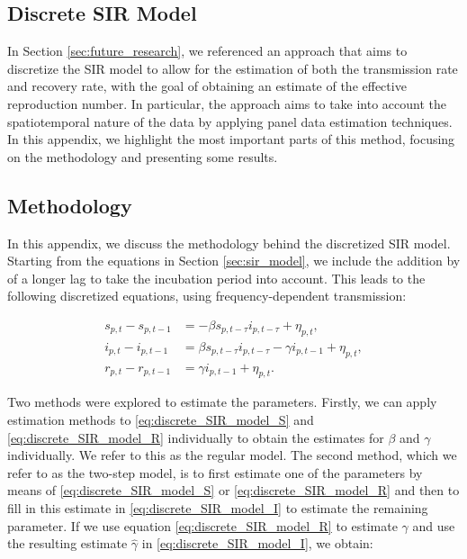\documentclass[12pt]{article}
\begin{document}
\begin{appendices}
		\newpage
		\section{Discrete SIR Model} \label{app:discrete_SIR}
		In Section \ref{sec:future_research}, we referenced an approach that aims to discretize the SIR model to allow for the estimation of both the transmission rate and recovery rate, with the goal of obtaining an estimate of the effective reproduction number. In particular, the approach aims to take into account the spatiotemporal nature of the data by applying panel data estimation techniques. In this appendix, we highlight the most important parts of this method, focusing on the methodology and presenting some results.
		
		\subsection{Methodology} \label{sapp:discrete_SIR_methodology}
		In this appendix, we discuss the methodology behind the discretized SIR model. Starting from the equations in Section \ref{sec:sir_model}, we include the addition by \textcite{adda2016economic} of a longer lag to take the incubation period into account. This leads to the following discretized equations, using frequency-dependent transmission:
		
		\begin{align}
        	s_{p,t} - s_{p,t-1} &= -\beta s_{p,t-\tau}i_{p,t-\tau} + \eta_{p,t}, \label{eq:discrete_SIR_model_S}\\
        	i_{p,t} - i_{p,t-1} &= \beta s_{p,t-\tau}i_{p,t-\tau} - \gamma i_{p,t-1} + \eta_{p,t}, \label{eq:discrete_SIR_model_I}\\
        	r_{p,t} - r_{p,t-1} &= \gamma i_{p,t-1} + \eta_{p,t}. \label{eq:discrete_SIR_model_R}
    	\end{align}
	
    	Two methods were explored to estimate the parameters. Firstly, we can apply estimation methods to \eqref{eq:discrete_SIR_model_S} and \eqref{eq:discrete_SIR_model_R} individually to obtain the estimates for $\beta$ and $\gamma$ individually. We refer to this as the regular model. The second method, which we refer to as the two-step model, is to first estimate one of the parameters by means of \eqref{eq:discrete_SIR_model_S} or \eqref{eq:discrete_SIR_model_R} and then to fill in this estimate in \eqref{eq:discrete_SIR_model_I} to estimate the remaining parameter. If we use equation \eqref{eq:discrete_SIR_model_R} to estimate $\gamma$ and use the resulting estimate $\hat{\gamma}$ in \eqref{eq:discrete_SIR_model_I}, we obtain:
    	    

\end{appendices}
\end{document}
